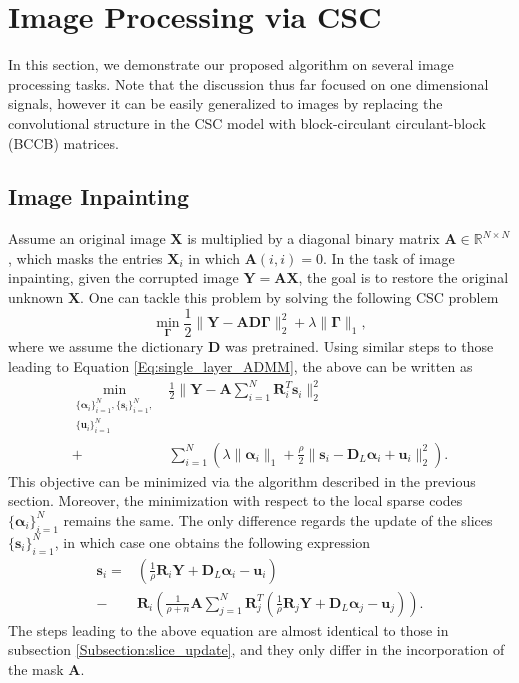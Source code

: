 \documentclass[10pt,twocolumn,letterpaper]{article}
\def\s{{\mathbf s}}
\def\X{{\mathbf X}}
\def\u{ \mathbf{u}}
\def\Y{{\mathbf Y}}
\def\u{{\mathbf u}}
\def\D{{\mathbf D}}
\def\A{{\mathbf A}}
\def\R{{\mathbf R}}
\def\alfa{{\boldsymbol \alpha}}
\def\Gama{{\boldsymbol \Gamma}}
\begin{document}
\section{Image Processing via CSC} \label{Sec:image_restoration}
In this section, we demonstrate our proposed algorithm on several image processing tasks. Note that the discussion thus far focused on one dimensional signals, however it can be easily generalized to images by replacing the convolutional structure in the CSC model with block-circulant circulant-block (BCCB) matrices.

\subsection{Image Inpainting} \label{Sec:inpainting}
Assume an original image $\X$ is multiplied by a diagonal binary matrix $\A \in \mathbb{R}^{N \times N}$, which masks the entries $\X_i$ in which $\A(i,i) = 0$. In the task of image inpainting, given the corrupted image $\Y = \A \X$, the goal is to restore the original unknown $\X$. One can tackle this problem by solving the following CSC problem
\begin{equation}
\min_{\Gama} \frac{1}{2} \| \Y - \A \D\Gama \|_2^2 + \lambda \| \Gama \|_1,
\end{equation}
where we assume the dictionary $\D$ was pretrained. Using similar steps to those leading to Equation \eqref{Eq:single_layer_ADMM}, the above can be written as
\begin{align}
\min_{ \substack{ \{ \alfa_i \}_{i=1}^N, \{ \s_i \}_{i=1}^N, \\ \{ \u_i \}_{i=1}^N } } & \frac{1}{2} \| \Y - \A \sum_{i=1}^N \R_i^T \s_i \|_2^2 \\
+ & \sum_{i=1}^N \left( \lambda \| \alfa_i \|_1 + \frac{\rho}{2} \| \s_i - \D_L \alfa_i + \u_i \|_2^2 \right).
\end{align}
This objective can be minimized via the algorithm described in the previous section. Moreover, the minimization with respect to the local sparse codes $\{ \alfa_i \}_{i=1}^N$ remains the same. The only difference regards the update of the slices $\{ \s_i \}_{i=1}^N$, in which case one obtains the following expression
\begin{align}
\s_i = & \left( \frac{1}{\rho} \R_i \Y + \D_L \alfa_i - \u_i \right) \\
- & \R_i \left( \frac{1}{\rho + n} \A \sum_{j=1}^N \R_j^T \left( \frac{1}{\rho} \R_j \Y + \D_L \alfa_j - \u_j \right) \right).
\end{align}
The steps leading to the above equation are almost identical to those in subsection \ref{Subsection:slice_update}, and they only differ in the incorporation of the mask $\A$.
\end{document}
